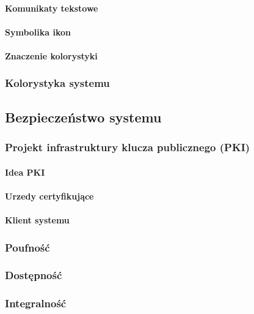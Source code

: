 		\paragraph{Komunikaty tekstowe}
		\paragraph{Symbolika ikon}
		\paragraph{Znaczenie kolorystyki}
		
	\subsubsection{Kolorystyka systemu}
	
\newpage
\subsection{Bezpieczeństwo systemu}
	\subsubsection{Projekt infrastruktury klucza publicznego (PKI)}
		\paragraph{Idea PKI}
		\paragraph{Urzedy certyfikujące}
		\paragraph{Klient systemu}
	\subsubsection{Poufność}
	\subsubsection{Dostępność}
	\subsubsection{Integralność}